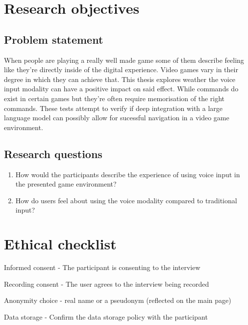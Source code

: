 

\section{Research objectives}

\subsection{Problem statement}

When  people are  playing a really well made game some of them  describe feeling like they're directly inside of the digital experience.
Video games vary in their degree in which they can achieve that. This thesis explores weather the voice input modality can have a positive impact on said effect. 
While commands do exist in certain games but they're often require memorisation of the right commands.
These tests attempt to verify if deep integration with a large language model can possibly allow for sucessful 
navigation in a video game environment. 

\subsection{Research questions}

\begin{enumerate}
    \item How would the participants describe the experience of using voice input in the presented
game environment?
    \item How do users feel about using the voice modality compared to traditional input?
\end{enumerate}

\section{Ethical checklist}
    \begin{todolist}
    \item Informed consent - The participant is consenting to the interview
    \item Recording consent - The user agrees to the interview being recorded
    \item Anonymity choice - real name or a pseudonym (reflected on the main page)
    \item Data storage - Confirm the data storage policy with the participant
    \end{todolist}

